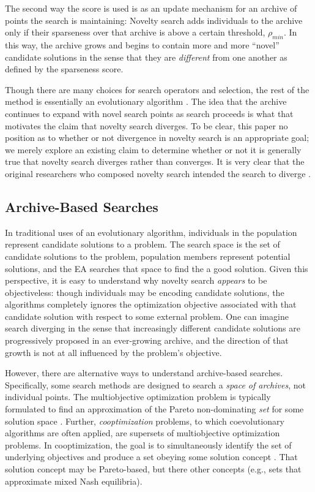 \documentclass[twoside]{article}
\begin{document}
The second way the score is used is as an update mechanism for an archive of points the search is maintaining:  Novelty search adds individuals to the archive only if their sparseness over that archive is above a certain threshold, $\rho_{min}$.  In this way, the archive grows and begins to contain more and more ``novel'' candidate solutions in the sense that they are \emph{different} from one another as defined by the sparseness score.

Though there are many choices for search operators and selection, the rest of the method is essentially an evolutionary algorithm \cite{ec:DeJong2006}.  The idea that the archive continues to expand with novel search points as search proceeds is what that motivates the claim that novelty search diverges.  To be clear, this paper no position as to whether or not divergence in novelty search is an appropriate goal; we merely explore an existing claim to determine whether or not it is generally true that novelty search diverges rather than converges.  It is very clear that the original researchers who composed novelty search intended the search to diverge \cite{Lehman2016frai,Lehman2015gecco,StanleyLehman2015}.


\subsection{Archive-Based Searches}
\label{subsec:archive}

In traditional uses of an evolutionary algorithm, individuals in the population represent candidate solutions to a problem.  The search space is the set of candidate solutions to the problem, population members represent potential solutions, and the EA searches that space to find the a good solution.  Given this perspective, it is easy to understand why novelty search \emph{appears} to be objectiveless:  though individuals may be encoding candidate solutions, the algorithms completely ignores the optimization objective associated with that candidate solution with respect to some external problem.  One can imagine search diverging in the sense that increasingly different candidate solutions are progressively proposed in an ever-growing archive, and the direction of that growth is not at all influenced by the problem's objective.  

However, there are alternative ways to understand archive-based searches.  Specifically, some search methods are designed to search a \emph{space of archives}, not individual points.  The multiobjective optimization problem is typically formulated to find an approximation of the Pareto non-dominating \emph{set} for some solution space \cite{SeadaDeb2018moo,Zitzler2012,Zitzler2000ecj}.  Further, \emph{cooptimization} problems, to which coevolutionary algorithms are often applied, are supersets of multiobjective optimization problems.  In cooptimization, the goal is to simultaneously identify the set of underlying objectives and produce a set obeying some solution concept \cite{FiciciPollack2001ecal,BucciPollack2002foga,Popovici2012,Ficici2008mpsn}.  That solution concept may be Pareto-based, but there other concepts (e.g., sets that approximate mixed Nash equilibria).
\end{document}
